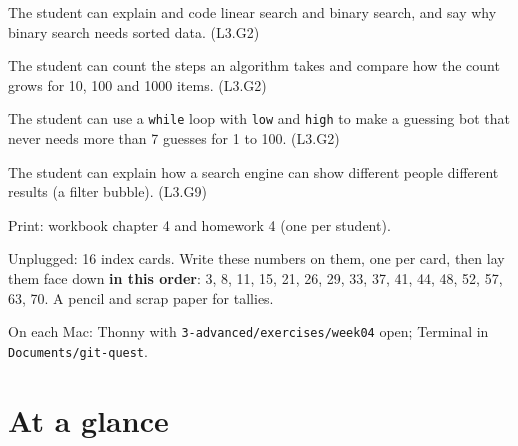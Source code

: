 
\begin{objectives}
  \item The student can explain and code linear search and binary search, and say why binary search needs sorted data. (L3.G2)
  \item The student can count the steps an algorithm takes and compare how the count grows for 10, 100 and 1000 items. (L3.G2)
  \item The student can use a \texttt{while} loop with \texttt{low} and \texttt{high} to make a guessing bot that never needs more than 7 guesses for 1 to 100. (L3.G2)
  \item The student can explain how a search engine can show different people different results (a filter bubble). (L3.G9)
\end{objectives}

\begin{materials}
  \item Print: workbook chapter 4 and homework 4 (one per student).
  \item Unplugged: 16 index cards. Write these numbers on them, one per card, then lay them face down \textbf{in this order}: 3, 8, 11, 15, 21, 26, 29, 33, 37, 41, 44, 48, 52, 57, 63, 70. A pencil and scrap paper for tallies.
  \item On each Mac: Thonny with \texttt{3-advanced/exercises/week04} open; Terminal in \texttt{Documents/git-quest}.
\end{materials}

\section{At a glance}
\begin{timeplan}
\end{timeplan}

